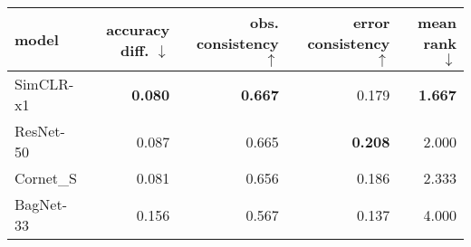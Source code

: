 \begin{tabular}{lrrrr}
\toprule
    model & accuracy diff. $\downarrow$ & obs. consistency $\uparrow$ & error consistency $\uparrow$ & mean rank $\downarrow$ \\
\midrule
SimCLR-x1 &              \textbf{0.080} &              \textbf{0.667} &                        0.179 &         \textbf{1.667} \\
ResNet-50 &                       0.087 &                       0.665 &               \textbf{0.208} &                  2.000 \\
Cornet\_S &                       0.081 &                       0.656 &                        0.186 &                  2.333 \\
BagNet-33 &                       0.156 &                       0.567 &                        0.137 &                  4.000 \\
\bottomrule
\end{tabular}

